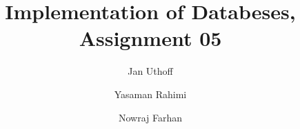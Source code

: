 \documentclass{exercisesheet}
\title{Implementation of Databeses, Assignment 05}
\author{
    Jan Uthoff
    \and
    Yasaman Rahimi
    \and
    Nowraj Farhan
}
\begin{document}
\maketitle

\pointtable


\end{document}
